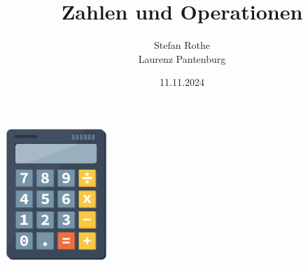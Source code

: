 \documentclass[parskip=half]{scrartcl}
\title{Zahlen und Operationen}
\author{Stefan Rothe\\
Laurenz Pantenburg}
\date{11.11.2024}
\begin{document}
  \maketitle
  \thispagestyle{firstpage}
  \begin{center}
    \includegraphics[height=50mm]{calculator.pdf}
  \end{center}
  \tableofcontents
  \clearpage

  
  
  
  
  
  
  
  
  
  
  
  
  
  
%  
\end{document}
